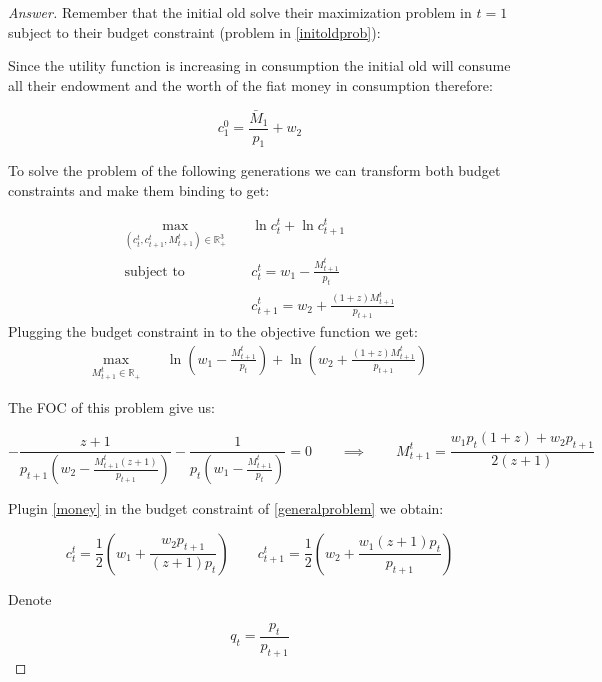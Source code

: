 \documentclass{article}
\theoremstyle{definition}
\newcommand{\qiq}{\qquad \implies \qquad}
\begin{document}
\begin{proof}[Answer]
Remember that the initial old solve their maximization problem in $t=1$ subject to their budget constraint (problem in \eqref{initoldprob}):

Since the utility function is increasing in consumption the initial old will consume all their endowment and the worth of the fiat money in consumption therefore:

\begin{equation}
\boxed{c^0_1 = \frac{\bar{M}_1}{p_1}+w_2}
\end{equation}

To solve the problem of the following generations we can transform both budget constraints and make them binding to get:

\begin{align}\label{generalproblem}
\max_{(c^t_t,c^t_{t+1}, M^{t}_{t+1})\in \mathbb{R}_+^3 }&\quad \ln c^t_t + \ln c^t_{t+1} \\
\text{subject to} & \quad  c^t_t = w_1 - \frac{M^{t}_{t+1}}{p_t}\tag{BC}\\
 & \quad c^t_{t+1} = w_2 + \frac{(1+z)M^{t}_{t+1}}{p_{t+1}}\tag{BC}
\end{align}
Plugging the budget constraint in to the objective function we get:
\begin{align}\label{simprob}
\max_{M^{t}_{t+1} \in\mathbb{R}_+ }&\quad \ln\left(w_1 - \frac{M^{t}_{t+1}}{p_t}\right) + \ln \left( w_2 + \frac{(1+z)M^{t}_{t+1}}{p_{t+1}} \right)
\end{align}

The FOC of this problem give us:

\begin{equation}\label{money}
-\frac{z+1}{p_{t+1} \left(w_2-\frac{M^{t}_{t+1} (z+1)}{p_{t+1}}\right)}-\frac{1}{p_t \left(w_1-\frac{M^{t}_{t+1}}{p_t}\right)} = 0 \qiq  M^{t}_{t+1} =  \frac{w_1  p_t(1+z) +w_2 p_{t+1}}{2 (z+1)}
\end{equation}

Plugin \eqref{money} in the budget constraint of \eqref{generalproblem} we obtain:

\begin{equation}\label{ct1w20}
   c^t_{t} =\frac{1}{2} \left(w_1+\frac{w_2 p_{t+1}}{(z+1) p_t}\right) \qquad c^t_{t+1} = \frac{1}{2} \left(w_2+\frac{w_1 (z+1) p_t}{p_{t+1}}\right)
\end{equation}

Denote 

$$q_t = \frac{p_t}{p_{t+1}}$$


\end{proof}
\end{document}
